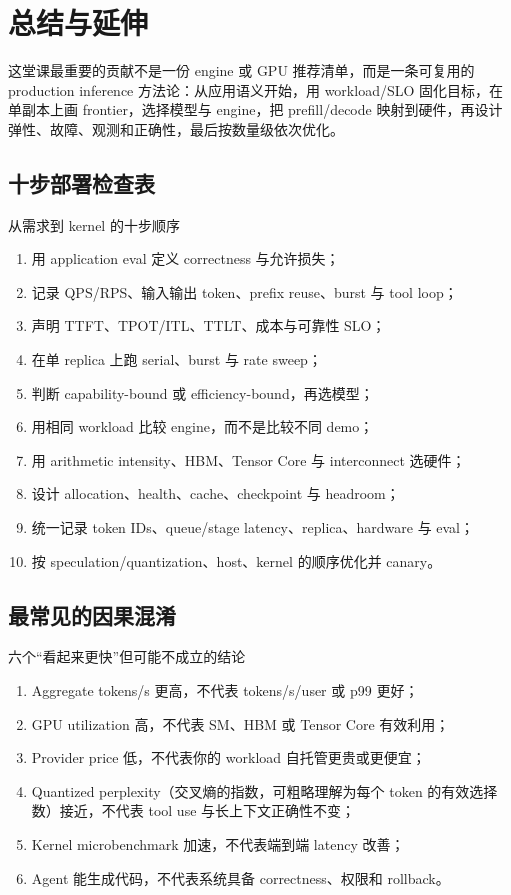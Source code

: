 \section{总结与延伸}

这堂课最重要的贡献不是一份 engine 或 GPU 推荐清单，而是一条可复用的 production inference 方法论：从应用语义开始，用 workload/SLO 固化目标，在单副本上画 frontier，选择模型与 engine，把 prefill/decode 映射到硬件，再设计弹性、故障、观测和正确性，最后按数量级依次优化。

\subsection{十步部署检查表}

\begin{importantbox}{从需求到 kernel 的十步顺序}
\begin{enumerate}
  \item 用 application eval 定义 correctness 与允许损失；
  \item 记录 QPS/RPS、输入输出 token、prefix reuse、burst 与 tool loop；
  \item 声明 TTFT、TPOT/ITL、TTLT、成本与可靠性 SLO；
  \item 在单 replica 上跑 serial、burst 与 rate sweep；
  \item 判断 capability-bound 或 efficiency-bound，再选模型；
  \item 用相同 workload 比较 engine，而不是比较不同 demo；
  \item 用 arithmetic intensity、HBM、Tensor Core 与 interconnect 选硬件；
  \item 设计 allocation、health、cache、checkpoint 与 headroom；
  \item 统一记录 token IDs、queue/stage latency、replica、hardware 与 eval；
  \item 按 speculation/quantization、host、kernel 的顺序优化并 canary。
\end{enumerate}
\end{importantbox}

\subsection{最常见的因果混淆}

\begin{warningbox}{六个“看起来更快”但可能不成立的结论}
\begin{enumerate}
  \item Aggregate tokens/s 更高，不代表 tokens/s/user 或 p99 更好；
  \item GPU utilization 高，不代表 SM、HBM 或 Tensor Core 有效利用；
  \item Provider price 低，不代表你的 workload 自托管更贵或更便宜；
  \item Quantized perplexity（交叉熵的指数，可粗略理解为每个 token 的有效选择数）接近，不代表 tool use 与长上下文正确性不变；
  \item Kernel microbenchmark 加速，不代表端到端 latency 改善；
  \item Agent 能生成代码，不代表系统具备 correctness、权限和 rollback。
\end{enumerate}
\end{warningbox}

